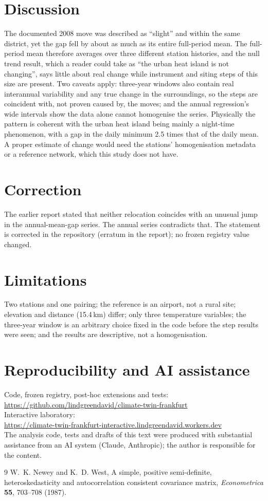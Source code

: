 \documentclass[11pt]{article}
\begin{document}
\section{Discussion}
The documented 2008 move was described as ``slight'' and within the same district, yet the gap fell by about as much as its
entire full-period mean. The full-period mean therefore averages over three different station histories, and the null
trend result, which a reader could take as ``the urban heat island is not changing'', says little about real change while
instrument and siting steps of this size are present. Two caveats apply: three-year windows also contain real
interannual variability and any true change in the surroundings, so the steps are coincident with, not proven
caused by, the moves; and the annual regression's wide intervals show the data alone cannot homogenise the series.
Physically the pattern is coherent with the urban heat island being mainly a night-time phenomenon, with a gap in the daily
minimum 2.5 times that of the daily mean. A proper estimate of change would need the stations' homogenisation metadata or a
reference network, which this study does not have.

\section{Correction}
The earlier report stated that neither relocation coincides with an unusual jump in the annual-mean-gap series. The annual
series contradicts that. The statement is corrected in the repository (erratum in the report); no frozen registry value changed.

\section{Limitations}
Two stations and one pairing; the reference is an airport, not a rural site; elevation and distance (15.4\,km) differ; only
three temperature variables; the three-year window is an arbitrary choice fixed in the code before the step results were seen; and the results are descriptive, not a homogenisation.

\section*{Reproducibility and AI assistance}
Code, frozen registry, post-hoc extensions and tests:\\
\url{https://github.com/lindgreendavid/climate-twin-frankfurt}\\
Interactive laboratory:\\
\url{https://climate-twin-frankfurt-interactive.lindgreendavid.workers.dev}\\
The analysis code, tests and drafts of this text were produced with substantial assistance from an AI system (Claude, Anthropic);
the author is responsible for the content.

\begin{thebibliography}{9}
 W.~K. Newey and K.~D. West, A simple, positive semi-definite, heteroskedasticity and autocorrelation
consistent covariance matrix, \emph{Econometrica} \textbf{55}, 703--708 (1987).
\end{thebibliography}
\end{document}
